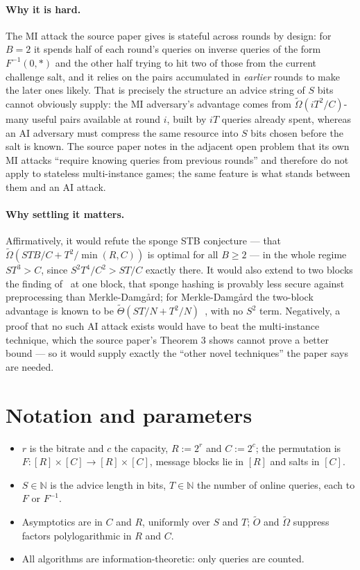 \documentclass{conjura-conjecture}
\newcommand{\tO}{\tilde{O}}
\newcommand{\tOm}{\tilde{\Omega}}
\begin{document}
\paragraph{Why it is hard.}
The MI attack the source paper gives is stateful across rounds by
design: for $B = 2$ it spends half of each round's queries on inverse
queries of the form $F^{-1}(0,\ast)$ and the other half trying to hit
two of those from the current challenge salt, and it relies on the
pairs accumulated in \emph{earlier} rounds to make the later ones
likely. That is precisely the structure an advice string of $S$ bits
cannot obviously supply: the MI adversary's advantage comes from
$\tOm(i T^{2}/C)$-many useful pairs available at round $i$, built by
$iT$ queries already spent, whereas an AI adversary must compress the
same resource into $S$ bits chosen before the salt is known. The source
paper notes in the adjacent open problem that its own MI attacks
``require knowing queries from previous rounds'' and therefore do not
apply to stateless multi-instance games; the same feature is what
stands between them and an AI attack.

\paragraph{Why settling it matters.}
Affirmatively, it would refute the sponge STB conjecture --- that
$\tOm(STB/C + T^{2}/\min(R,C))$ is optimal for all $B \ge 2$ --- in
the whole regime $ST^{3} > C$, since $S^{2}T^{4}/C^{2} > ST/C$ exactly
there. It would also extend to two blocks the finding
of~\cite{FGK22} at one block, that sponge hashing is provably less
secure against preprocessing than Merkle-Damg\aa{}rd; for
Merkle-Damg\aa{}rd the two-block advantage is known to be
$\tilde{\Theta}(ST/N + T^{2}/N)$~\cite{ACDW20,AGL22}, with no
$S^{2}$ term. Negatively, a proof that no such AI attack exists would
have to beat the multi-instance technique, which the source paper's
Theorem 3 shows cannot prove a better bound --- so it would supply
exactly the ``other novel techniques'' the paper says are needed.

\section{Notation and parameters}\label{sec:notation}

\begin{itemize}
\item $r$ is the bitrate and $c$ the capacity, $R := 2^{r}$ and
  $C := 2^{c}$; the permutation is
  $F : [R] \times [C] \to [R] \times [C]$, message blocks lie in $[R]$
  and salts in $[C]$.
\item $S \in \mathbb{N}$ is the advice length in bits, $T \in
  \mathbb{N}$ the number of online queries, each to $F$ or $F^{-1}$.
\item Asymptotics are in $C$ and $R$, uniformly over $S$ and $T$;
  $\tO$ and $\tOm$ suppress factors polylogarithmic in $R$ and $C$.
\item All algorithms are information-theoretic: only queries are
  counted.
\end{itemize}
\end{document}
